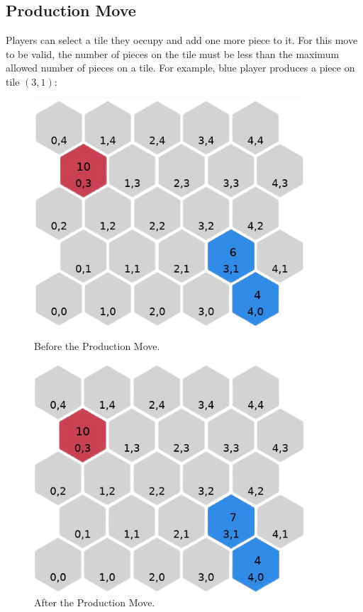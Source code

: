 \documentclass[letterpaper, 12pt]{article}
\begin{document}
\subsection*{Production Move}
Players can select a tile they occupy and add one more piece to it. For this move to be
valid, the number of pieces on the tile must be less than the maximum allowed number of
pieces on a tile. For example, blue player produces a piece on tile \((3, 1)\):

\begin{figure}[H]
  \begin{minipage}[c]{.5\textwidth}
    \centering
    \includegraphics[width=0.9\textwidth]{production_example_1.png}
    \caption{Before the Production Move.}
    \label{fig:production_move}
  \end{minipage}%
  \begin{minipage}[c]{.5\textwidth} \centering
    \includegraphics[width=0.9\textwidth]{production_example_2.png}
    \caption{After the Production Move.}
  \end{minipage}
\end{figure}
\end{document}
